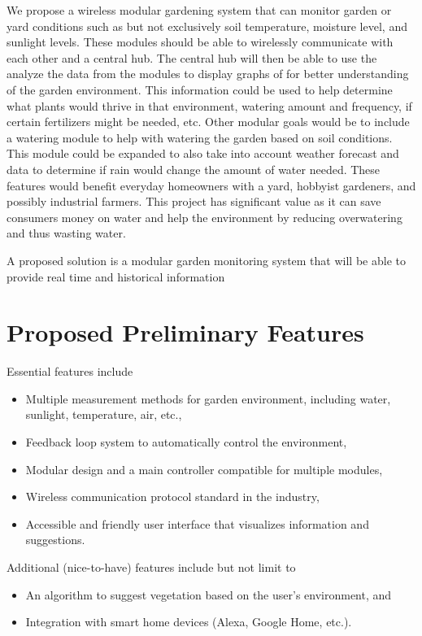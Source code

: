 \documentclass[]{article}
\begin{document}
	We propose a wireless modular gardening system that can monitor garden or yard conditions such as but not exclusively soil temperature, moisture level, and sunlight levels. These modules should be able to wirelessly communicate with each other and a central hub. The central hub will then be able to use the analyze the data from the modules to display graphs of for better understanding of the garden environment. This information could be used to help determine what plants would thrive in that environment, watering amount and frequency, if certain fertilizers might be needed, etc. Other modular goals would be to include a watering module to help with watering the garden based on soil conditions. This module could be expanded to also take into account weather forecast and data to determine if rain would change the amount of water needed. These features would benefit everyday homeowners with a yard, hobbyist gardeners, and possibly industrial farmers. This project has significant value as it can save consumers money on water and help the environment by reducing overwatering and thus wasting water. 
	
	A proposed solution is a modular garden monitoring system that will be able to provide real time and historical information
	

\section*{Proposed Preliminary Features}
\noindent Essential features include
\begin{itemize}
	\item Multiple measurement methods for garden environment, including water, sunlight, temperature, air, etc.,
	\item Feedback loop system to automatically control the environment,
	\item Modular design and a main controller compatible for multiple modules,
	\item Wireless communication protocol standard in the industry,
	\item Accessible and friendly user interface that visualizes information and suggestions.
\end{itemize}
Additional (nice-to-have) features include but not limit to
\begin{itemize}
	\item An algorithm to suggest vegetation based on the user's environment, and
	\item Integration with smart home devices (Alexa, Google Home, etc.).
\end{itemize}
	
\end{document}
